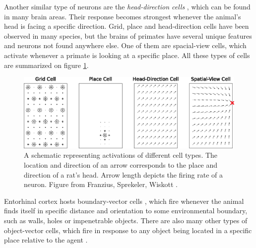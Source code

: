 \documentclass[12pt]{article}
\begin{document}
Another similar type of neurons are the \textit{head-direction cells} \cite{HD_cells}, which can be found in many brain areas. Their response becomes strongest whenever the animal's head is facing a specific direction. Grid, place and head-direction cells have been observed in many species, but the brains of primates have several unique features and neurons not found anywhere else. One of them are spacial-view cells, which activate whenever a primate is looking at a specific place. All these types of cells are summarized on figure  \ref{fig:place_grid_head_view_cells}.
\begin{figure}[!htbp]
	\centering
	\includegraphics[width=12cm]{place_grid_head_view_cells}
	\caption{A schematic representing activations of different cell types. The location and direction of an arrow corresponds to the place and direction of a rat's head. Arrow length depicts the firing rate of a neuron. Figure from  Franzius, Sprekeler, Wiskott \cite{slowness_sparseness}.}
	\label{fig:place_grid_head_view_cells}
\end{figure}

Entorhinal cortex hosts boundary-vector cells \cite{BVC}, which fire whenever the animal finds itself in specific distance and orientation to some environmental boundary, such as walls, holes or impenetrable objects.  There are also many other types of object-vector cells, which fire in response to any object being located in a specific place relative to the agent \cite{vector_trace_cells}.
\end{document}
